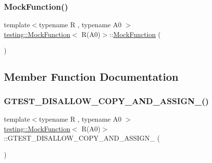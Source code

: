 \subsubsection{\texorpdfstring{MockFunction()}{MockFunction()}}
{\footnotesize\ttfamily template$<$typename R , typename A0 $>$ \\
\mbox{\hyperlink{classtesting_1_1_mock_function}{testing\+::\+Mock\+Function}}$<$ R(A0)$>$\+::\mbox{\hyperlink{classtesting_1_1_mock_function}{Mock\+Function}} (\begin{DoxyParamCaption}{ }\end{DoxyParamCaption})\hspace{0.3cm}{\ttfamily [inline]}}



\subsection{Member Function Documentation}
\mbox{\label{classtesting_1_1_mock_function_3_01_r_07_a0_08_4_a750f5e7990ed0ad79801448c5fbb30d3}} 
\subsubsection{\texorpdfstring{GTEST\_DISALLOW\_COPY\_AND\_ASSIGN\_()}{GTEST\_DISALLOW\_COPY\_AND\_ASSIGN\_()}}
{\footnotesize\ttfamily template$<$typename R , typename A0 $>$ \\
\mbox{\hyperlink{classtesting_1_1_mock_function}{testing\+::\+Mock\+Function}}$<$ R(A0)$>$\+::G\+T\+E\+S\+T\+\_\+\+D\+I\+S\+A\+L\+L\+O\+W\+\_\+\+C\+O\+P\+Y\+\_\+\+A\+N\+D\+\_\+\+A\+S\+S\+I\+G\+N\+\_\+ (\begin{DoxyParamCaption}\item[{\mbox{\hyperlink{classtesting_1_1_mock_function}{Mock\+Function}}$<$ R(A0)$>$}]{ }\end{DoxyParamCaption})\hspace{0.3cm}{\ttfamily [private]}}

\mbox{\label{classtesting_1_1_mock_function_3_01_r_07_a0_08_4_a6a22e7e14b53d2df30bef4404b41fade}} 
